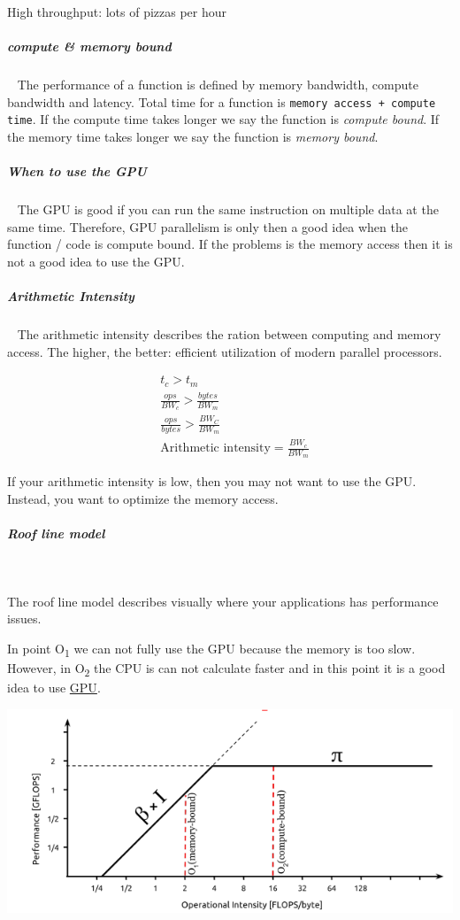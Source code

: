 \documentclass[11pt,twoside,landscape]{article}
\begin{document}
\begin{multicols}{3}
{{High throughput: lots of pizzas per hour
\subparagraph{compute \& memory bound} \
\label{sec:org2db0e37}
The performance of a function is defined by memory bandwidth, compute bandwidth and latency.
Total time for a function is \texttt{memory access + compute time}.
If the compute time takes longer we say the function is \emph{compute bound}.
If the memory time takes longer we say the function is \emph{memory bound}.

\subparagraph{When to use the GPU} \
\label{sec:orgd15cc58}
The GPU is good if you can run the same instruction on multiple data at the same time.
Therefore, GPU parallelism is only then a good idea when the function / code is compute bound.
If the problems is the memory access then it is not a good idea to use the GPU.

\subparagraph{Arithmetic Intensity} \
\label{sec:org5d55a74}
The arithmetic intensity describes the ration between computing and memory access.
The higher, the better: efficient utilization of modern parallel processors.

\begin{equation}
  \begin{align}
    &t_c > t_m \\
    &\frac{ops}{BW_c} > \frac{bytes}{BW_m} \\
    &\frac{ops}{bytes} > \frac{BW_C}{BW_m} \\
    &\text{Arithmetic intensity} = \frac{BW_c}{BW_m}
  \end{align}
\end{equation}

If your arithmetic intensity is low, then you may not want to use the GPU.
Instead, you want to optimize the memory access.

\subparagraph{Roof line model} \
\label{sec:orgec0b1ba}

The roof line model describes visually where your applications has performance issues.

In point O\textsubscript{1} we can not fully use the GPU because the memory is too slow.
However, in O\textsubscript{2} the CPU is can not calculate faster and in this point it is a good idea to use \href{../../../roam/20220518173241-gpu.org}{GPU}. 


{
\begin{center}
\includegraphics[width=.9\linewidth]{img/roof_line_model.png}
\end{center}
\label{fig:roof-line-model}
}

}}
\end{multicols}
\end{document}

